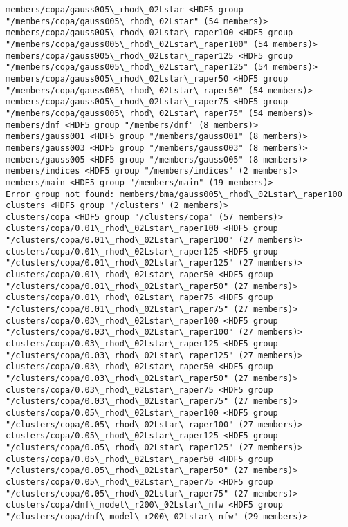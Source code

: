 \documentclass[11pt]{article}
\begin{document}
\begin{Verbatim}[commandchars=\\\{\}]
members/copa/gauss005\_rhod\_02Lstar <HDF5 group "/members/copa/gauss005\_rhod\_02Lstar" (54 members)>
members/copa/gauss005\_rhod\_02Lstar\_raper100 <HDF5 group "/members/copa/gauss005\_rhod\_02Lstar\_raper100" (54 members)>
members/copa/gauss005\_rhod\_02Lstar\_raper125 <HDF5 group "/members/copa/gauss005\_rhod\_02Lstar\_raper125" (54 members)>
members/copa/gauss005\_rhod\_02Lstar\_raper50 <HDF5 group "/members/copa/gauss005\_rhod\_02Lstar\_raper50" (54 members)>
members/copa/gauss005\_rhod\_02Lstar\_raper75 <HDF5 group "/members/copa/gauss005\_rhod\_02Lstar\_raper75" (54 members)>
members/dnf <HDF5 group "/members/dnf" (8 members)>
members/gauss001 <HDF5 group "/members/gauss001" (8 members)>
members/gauss003 <HDF5 group "/members/gauss003" (8 members)>
members/gauss005 <HDF5 group "/members/gauss005" (8 members)>
members/indices <HDF5 group "/members/indices" (2 members)>
members/main <HDF5 group "/members/main" (19 members)>
Error group not found: members/bma/gauss005\_rhod\_02Lstar\_raper100
clusters <HDF5 group "/clusters" (2 members)>
clusters/copa <HDF5 group "/clusters/copa" (57 members)>
clusters/copa/0.01\_rhod\_02Lstar\_raper100 <HDF5 group "/clusters/copa/0.01\_rhod\_02Lstar\_raper100" (27 members)>
clusters/copa/0.01\_rhod\_02Lstar\_raper125 <HDF5 group "/clusters/copa/0.01\_rhod\_02Lstar\_raper125" (27 members)>
clusters/copa/0.01\_rhod\_02Lstar\_raper50 <HDF5 group "/clusters/copa/0.01\_rhod\_02Lstar\_raper50" (27 members)>
clusters/copa/0.01\_rhod\_02Lstar\_raper75 <HDF5 group "/clusters/copa/0.01\_rhod\_02Lstar\_raper75" (27 members)>
clusters/copa/0.03\_rhod\_02Lstar\_raper100 <HDF5 group "/clusters/copa/0.03\_rhod\_02Lstar\_raper100" (27 members)>
clusters/copa/0.03\_rhod\_02Lstar\_raper125 <HDF5 group "/clusters/copa/0.03\_rhod\_02Lstar\_raper125" (27 members)>
clusters/copa/0.03\_rhod\_02Lstar\_raper50 <HDF5 group "/clusters/copa/0.03\_rhod\_02Lstar\_raper50" (27 members)>
clusters/copa/0.03\_rhod\_02Lstar\_raper75 <HDF5 group "/clusters/copa/0.03\_rhod\_02Lstar\_raper75" (27 members)>
clusters/copa/0.05\_rhod\_02Lstar\_raper100 <HDF5 group "/clusters/copa/0.05\_rhod\_02Lstar\_raper100" (27 members)>
clusters/copa/0.05\_rhod\_02Lstar\_raper125 <HDF5 group "/clusters/copa/0.05\_rhod\_02Lstar\_raper125" (27 members)>
clusters/copa/0.05\_rhod\_02Lstar\_raper50 <HDF5 group "/clusters/copa/0.05\_rhod\_02Lstar\_raper50" (27 members)>
clusters/copa/0.05\_rhod\_02Lstar\_raper75 <HDF5 group "/clusters/copa/0.05\_rhod\_02Lstar\_raper75" (27 members)>
clusters/copa/dnf\_model\_r200\_02Lstar\_nfw <HDF5 group "/clusters/copa/dnf\_model\_r200\_02Lstar\_nfw" (29 members)>

\end{Verbatim}
\end{document}
